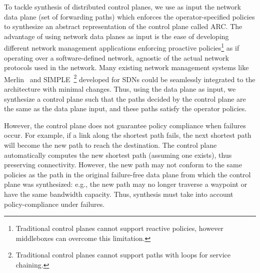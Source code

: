 To tackle synthesis 
of distributed control planes, 
we use as input the network data plane 
(set of forwarding paths)  which 
enforces the operator-specified policies to
synthesize an abstract representation of the control plane
called ARC. 
The advantage of using network data planes as 
input is the ease of developing
different network management applications 
enforcing proactive policies\footnote{
Traditional control planes cannot support reactive policies, however
middleboxes can overcome this limitation.} 
as if operating over a software-defined
network, agnostic of the actual network protocols used in the network.
Many existing network management systems like Merlin~\cite{merlin} 
and SIMPLE~\cite{simple}\footnote{
Traditional control planes cannot support 
paths with loops for service chaining.} developed for SDNs 
could be seamlessly integrated to the architecture with minimal changes.
Thus, using the data plane as input, we synthesize a control plane
such that the paths decided by the control plane are the same 
as the data plane input, and these paths satisfy the operator 
policies.

However, the control plane does not guarantee policy compliance 
when failures occur. For
example, if a link along the shortest path 
fails,  the next shortest path will become the new path to reach the
destination. The control plane automatically computes the new shortest path
(assuming one exists), thus preserving connectivity. 
However, the new path may
not conform to the same policies as the path in the 
original failure-free data
plane from which the control plane was synthesized: 
e.g., the new path may no longer
traverse a waypoint or have the same bandwidth capacity. Thus,
synthesis must take into account policy-compliance under failures.


